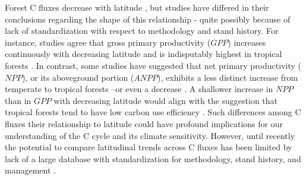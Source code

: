 \documentclass[
]{article}
\begin{document}
Forest C fluxes decrease with latitude
\citep[e.g.,][]{luyssaert_co_2007, piao_forest_2010, gillman_latitude_2015, li_mapping_2019},
but studies have differed in their conclusions regarding the shape of
this relationship - quite possibly because of lack of standardization
with respect to methodology and stand history. For instance, studies
agree that gross primary productivity (\(GPP\)) increases continuously
with decreasing latitude and is indisputably highest in tropical forests
\citep{luyssaert_co_2007, beer_terrestrial_2010, jung_global_2011, badgley_terrestrial_2019, li_mapping_2019}.
In contrast, some studies have suggested that net primary productivity
(\(NPP\)), or its aboveground portion (\(ANPP\)), exhibits a less
distinct increase from temperate to tropical forests
\citep{luyssaert_co_2007}--or even a decrease \citep[but see
\citet{gillman_latitude_2015}]{huston_global_2009}. A shallower increase
in \(NPP\) than in \(GPP\) with decreasing latitude would align with the
suggestion that tropical forests tend to have low carbon use efficiency
\citep[\(CUE\)=
\(NPP\)/\(GPP\);][]{de_lucia_forest_2007, malhi_productivity_2012, anderson-teixeira_carbon_2016}.
Such differences among C fluxes their relationship to latitude could
have profound implications for our understanding of the C cycle and its
climate sensitivity. However, until recently the potential to compare
latitudinal trends across C fluxes has been limited by lack of a large
database with standardization for methodology, stand history, and
management \citep{anderson-teixeira_forc_2018}.
\end{document}
